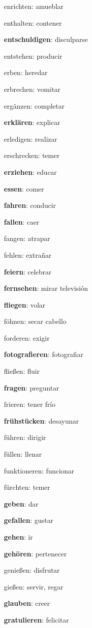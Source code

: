 \begin{multicols}{2}
\begin{myitemize}
\item enrichten: amueblar
\item enthalten: contener
\item \textbf{entschuldigen}: disculparse
\item entstehen: producir
\item erben: heredar
\item erbrechen: vomitar
\item ergänzen: completar
\item \textbf{erklären}: explicar
\item erledigen: realizar
\item erschrecken: temer
\item \textbf{erziehen}: educar
\item \textbf{essen}: comer
\item \textbf{fahren}: conducir
\item \textbf{fallen}: caer
\item fangen: atrapar
\item fehlen: extrañar
\item \textbf{feiern}: celebrar
\item \textbf{fernsehen}: mirar televisión
\item \textbf{fliegen}: volar
\item föhnen: secar cabello
\item forderen: exigir
\item \textbf{fotografieren}: fotografiar
\item fließen: fluir
\item \textbf{fragen}: preguntar
\item frieren: tener frío
\item \textbf{frühstücken}: desayunar
\item führen: dirigir
\item füllen: llenar
\item funktioneren: funcionar
\item fürchten: temer
\item \textbf{geben}: dar
\item \textbf{gefallen}: gustar
\item \textbf{gehen}: ir
\item \textbf{gehören}: pertenecer
\item genießen: disfrutar
\item gießen: servir, regar
\item \textbf{glauben}: creer
\item \textbf{gratulieren}: felicitar

\end{myitemize}
\end{multicols}
